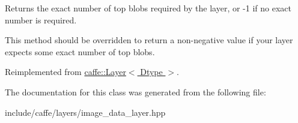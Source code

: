 Returns the exact number of top blobs required by the layer, or -\/1 if no exact number is required. 

This method should be overridden to return a non-\/negative value if your layer expects some exact number of top blobs. 

Reimplemented from \hyperlink{classcaffe_1_1Layer_aa3c99ed707e8db683a3043412e151af8}{caffe\+::\+Layer$<$ Dtype $>$}.



The documentation for this class was generated from the following file\+:\begin{DoxyCompactItemize}
\item 
include/caffe/layers/image\+\_\+data\+\_\+layer.\+hpp\end{DoxyCompactItemize}
